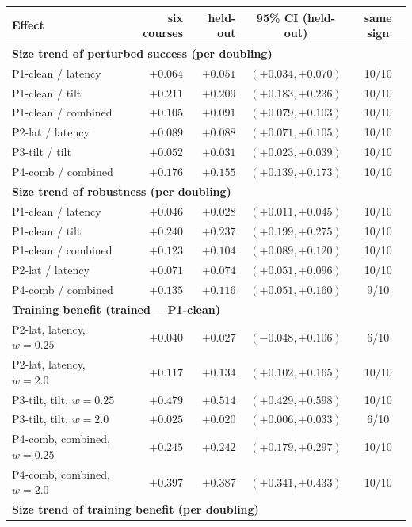 \begin{tabular}{@{}l r r c c@{}}
\toprule
Effect & six courses & held-out & 95\% CI (held-out) & same sign \\
\midrule
\multicolumn{5}{l}{\textbf{Size trend of perturbed success (per doubling)}} \\
P1-clean / latency & $+0.064$ & $+0.051$ & $(+0.034,+0.070)$ & 10/10 \\
P1-clean / tilt & $+0.211$ & $+0.209$ & $(+0.183,+0.236)$ & 10/10 \\
P1-clean / combined & $+0.105$ & $+0.091$ & $(+0.079,+0.103)$ & 10/10 \\
P2-lat / latency & $+0.089$ & $+0.088$ & $(+0.071,+0.105)$ & 10/10 \\
P3-tilt / tilt & $+0.052$ & $+0.031$ & $(+0.023,+0.039)$ & 10/10 \\
P4-comb / combined & $+0.176$ & $+0.155$ & $(+0.139,+0.173)$ & 10/10 \\
\midrule
\multicolumn{5}{l}{\textbf{Size trend of robustness (per doubling)}} \\
P1-clean / latency & $+0.046$ & $+0.028$ & $(+0.011,+0.045)$ & 10/10 \\
P1-clean / tilt & $+0.240$ & $+0.237$ & $(+0.199,+0.275)$ & 10/10 \\
P1-clean / combined & $+0.123$ & $+0.104$ & $(+0.089,+0.120)$ & 10/10 \\
P2-lat / latency & $+0.071$ & $+0.074$ & $(+0.051,+0.096)$ & 10/10 \\
P4-comb / combined & $+0.135$ & $+0.116$ & $(+0.051,+0.160)$ & 9/10 \\
\midrule
\multicolumn{5}{l}{\textbf{Training benefit (trained $-$ P1-clean)}} \\
P2-lat, latency, $w=0.25$ & $+0.040$ & $+0.027$ & $(-0.048,+0.106)$ & 6/10 \\
P2-lat, latency, $w=2.0$ & $+0.117$ & $+0.134$ & $(+0.102,+0.165)$ & 10/10 \\
P3-tilt, tilt, $w=0.25$ & $+0.479$ & $+0.514$ & $(+0.429,+0.598)$ & 10/10 \\
P3-tilt, tilt, $w=2.0$ & $+0.025$ & $+0.020$ & $(+0.006,+0.033)$ & 6/10 \\
P4-comb, combined, $w=0.25$ & $+0.245$ & $+0.242$ & $(+0.179,+0.297)$ & 10/10 \\
P4-comb, combined, $w=2.0$ & $+0.397$ & $+0.387$ & $(+0.341,+0.433)$ & 10/10 \\
\midrule
\multicolumn{5}{l}{\textbf{Size trend of training benefit (per doubling)}} \\

\end{tabular}
